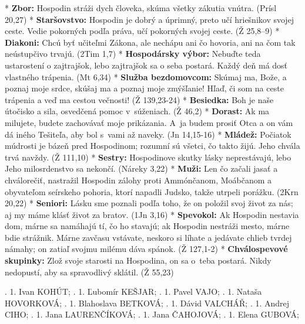 \begitems
* {\bf Zbor:} Hospodin stráži dych človeka, skúma všetky zákutia vnútra. (Prísl 20,27)
* {\bf Staršovstvo:} Hospodin je dobrý a úprimný, preto učí hriešnikov svojej ceste. Vedie pokorných podľa práva, učí pokorných svojej ceste. (Ž 25,8--9)
* {\bf Diakoni:} Chcú byť učiteľmi Zákona, ale nechápu ani čo hovoria, ani na čom tak neústupčivo trvajú. (2Tim 1,7)
* {\bf Hospodársky výbor:} Nebuďte teda ustarostení o zajtrajšok, lebo zajtrajšok sa o seba postará. Každý deň má dosť vlastného trápenia. (Mt 6,34)
* {\bf Služba bezdomovcom:} Skúmaj ma, Bože, a poznaj moje srdce, skúšaj ma a poznaj moje zmýšľanie! Hľaď, či som na ceste trápenia a veď ma cestou večnosti! (Ž 139,23-24)
* {\bf Besiedka:} Boh je naše útočisko a sila, osvedčená pomoc v~súženiach. (Ž 46,2)
* {\bf Dorast:} Ak ma milujete, budete zachovávať moje prikázania. A~ja budem prosiť Otca a on vám dá iného Tešiteľa, aby bol s~vami až naveky. (Jn 14,15-16)
* {\bf Mládež:} Počiatok múdrosti je bázeň pred Hospodinom; rozumní sú všetci, čo takto žijú. Jeho chvála trvá navždy. (Ž 111,10)
* {\bf Sestry:} Hospodinove skutky lásky neprestávajú, lebo Jeho milosrdenstvo sa nekončí. (Náreky 3,22)
* {\bf Muži:} Len čo začali jasať a chválorečiť, nastražil Hospodin zálohy proti Ammónčanom, Moábčanom a obyvateľom seírskeho pohoria, ktorí napadli Judsko, takže utrpeli porážku. (2Krn 20,22)
* {\bf Seniori:} Lásku sme poznali podľa toho, že on položil svoj život za nás; aj my máme klásť život za bratov. (1Jn 3,16)
* {\bf Spevokol:} Ak Hospodin nestavia dom, márne sa namáhajú tí, čo ho stavajú; ak Hospodin nestráži mesto, márne bdie strážnik. Márne zavčasu vstávate, neskoro si líhate a jedávate chlieb tvrdej námahy; on zatiaľ svojmu milému dáva spánok. (Ž 127,1-2)
* {\bf Chválospevové skupinky:} Zlož svoje starosti na Hospodina, on sa o~teba postará. Nikdy nedopustí, aby sa spravodlivý sklátil. (Ž 55,23)
\enditems


.	1.	Ivan	KOHÚT;
.	1.	Ľubomír	KEŠJAR;
.	1.	Pavel	VAJO;
.	1.	Nataša	HOVORKOVÁ;
.	1.	Blahoslava	BETKOVÁ;
.	1.	Dávid	VALCHÁŘ;
.	1.	Andrej	CIHO;
.	1.	Jana	LAURENČÍKOVÁ;
.	1.	Jana	ČAHOJOVÁ;
.	1.	Elena	GUBOVÁ;
\narodeniny


